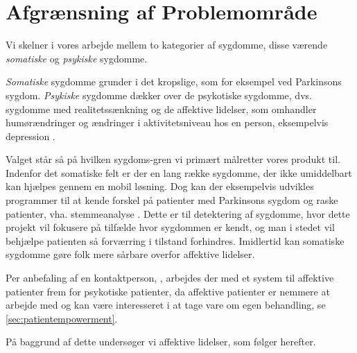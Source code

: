\section{Afgrænsning af Problemområde}
Vi skelner i vores arbejde mellem to kategorier af sygdomme, disse værende \textit{somatiske} og \textit{psykiske} sygdomme.

\textit{Somatiske} sygdomme grunder i det kropslige, som for eksempel ved Parkinsons sygdom.
\textit{Psykiske} sygdomme dækker over de psykotiske sygdomme, dvs. sygdomme med realitetssænkning og de affektive lidelser, som omhandler humørændringer og ændringer i aktivitetsniveau hos en person, eksempelvis depression \citep{misc:netpsykpsykose}. 

Valget står så på hvilken sygdoms-gren vi primært målretter vores produkt til.
Indenfor det somatiske felt er der en lang række sygdomme, der ikke umiddelbart kan hjælpes gennem en mobil løsning.
Dog kan der eksempelvis udvikles programmer til at kende forskel på patienter med Parkinsons sygdom og raske patienter, vha. stemmeanalyse \citep{6168572}.
Dette er til detektering af sygdomme, hvor dette projekt vil fokusere på tilfælde hvor sygdommen er kendt, og man i stedet vil behjælpe patienten så forværring i tilstand forhindres.
Imidlertid kan somatiske sygdomme gøre folk mere sårbare overfor affektive lidelser.

Per anbefaling af en kontaktperson, \citet{misc:janne-rasmussen}, arbejdes der med et system til affektive patienter frem for psykotiske patienter, da affektive patienter er nemmere at arbejde med og kan være interesseret i at tage vare om egen behandling, se \cref{sec:patientempowerment}.

På baggrund af dette undersøger vi affektive lidelser, som følger herefter.